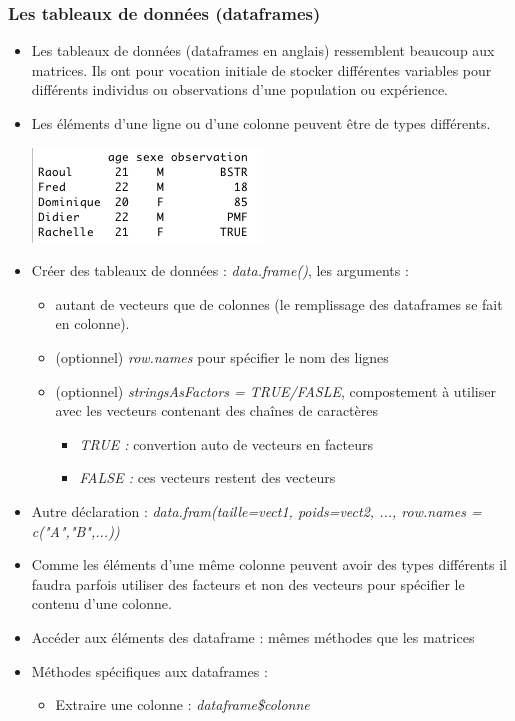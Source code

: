 \documentclass[12pt,a4paper]{article}
\begin{document}
\subsubsection{Les tableaux de données (dataframes)}
\begin{itemize}
\item Les tableaux de données (dataframes en anglais) ressemblent beaucoup aux matrices. Ils ont pour vocation initiale de stocker différentes variables pour différents individus ou observations d'une population ou expérience.
\item Les éléments d'une ligne ou d'une colonne peuvent être de types différents.
\begin{flushleft}
\includegraphics[scale=0.5]{dataframes}
\end{flushleft}
\item Créer des tableaux de données : \textit{data.frame()}, les arguments : 
\begin{itemize}
\item autant de vecteurs que de colonnes (le remplissage des dataframes se fait en colonne).
\item (optionnel) \textit{row.names} pour spécifier le nom des lignes
\item (optionnel) \textit{stringsAsFactors = TRUE/FASLE}, compostement à utiliser avec les vecteurs contenant des chaînes de caractères
\begin{itemize}
\item \textit{TRUE : } convertion auto de vecteurs en facteurs
\item \textit{FALSE : } ces vecteurs restent des vecteurs
\end{itemize}
\end{itemize}
\item Autre déclaration : 
\newline \textit{data.fram(taille=vect1, poids=vect2, ..., row.names = c("A","B",...))}
\item Comme les éléments d'une même colonne peuvent avoir des types différents il faudra parfois utiliser des facteurs et non des vecteurs pour spécifier le contenu d'une colonne.
\item Accéder aux éléments des dataframe : mêmes méthodes que les matrices
\item Méthodes spécifiques aux dataframes : 
\begin{itemize}
\item Extraire une colonne : \textit{dataframe\$colonne}
\end{itemize}

\end{itemize}
\end{document}
